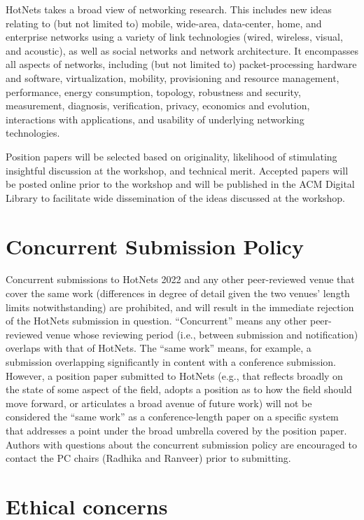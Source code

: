 \documentclass{proposal}
\begin{document}
HotNets takes a broad view of networking research. This includes new ideas relating to (but not limited to) mobile, wide-area, data-center, home, and enterprise networks using a variety of link technologies (wired, wireless, visual, and acoustic), as well as social networks and network architecture. It encompasses all aspects of networks, including (but not limited to) packet-processing hardware and software, virtualization, mobility, provisioning and resource management, performance, energy consumption, topology, robustness and security, measurement, diagnosis, verification, privacy, economics and evolution, interactions with applications, and usability of underlying networking technologies.

Position papers will be selected based on originality, likelihood of stimulating insightful discussion at the workshop, and technical merit. Accepted papers will be posted online prior to the workshop and will be published in the ACM Digital Library to facilitate wide dissemination of the ideas discussed at the workshop.


\section{Concurrent Submission Policy}

Concurrent submissions to HotNets 2022 and any other peer-reviewed venue that cover the same work (differences in degree of detail given the two venues' length limits notwithstanding) are prohibited, and will result in the immediate rejection of the HotNets submission in question. ``Concurrent'' means any other peer-reviewed venue whose reviewing period (i.e., between submission and notification) overlaps with that of HotNets. The ``same work'' means, for example, a submission overlapping significantly in content with a conference submission. However, a position paper submitted to HotNets (e.g., that reflects broadly on the state of some aspect of the field, adopts a position as to how the field should move forward, or articulates a broad avenue of future work) will not be considered the ``same work'' as a conference-length paper on a specific system that addresses a point under the broad umbrella covered by the position paper. Authors with questions about the concurrent submission policy are encouraged to contact the PC chairs (Radhika and Ranveer) prior to submitting.

\section{Ethical concerns}
\end{document}
